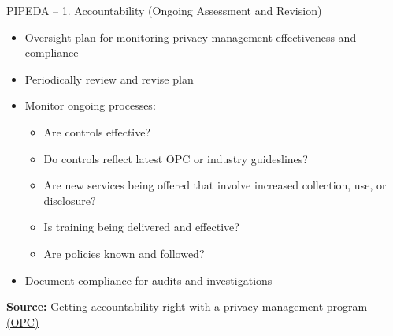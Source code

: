 \documentclass[ignorenonframetext,xcolor=x11names]{beamer}
\begin{document}
\begin{frame}[label=full]{PIPEDA -- 1. Accountability \small (Ongoing Assessment and Revision)}
\begin{itemize}
  \item Oversight plan for monitoring privacy management effectiveness and compliance
  \item Periodically review and revise plan
  \item Monitor ongoing processes:
  \begin{itemize}
     \item Are controls effective?
     \item Do controls reflect latest OPC or industry guideslines?
     \item Are new services being offered that involve increased collection, use, or disclosure?
     \item Is training being delivered and effective?
     \item Are policies known and followed?
  \end{itemize}
  \item Document compliance for audits and investigations
\end{itemize}

\vspace{\baselineskip}
\scriptsize \textbf{Source:} \href{https://www.priv.gc.ca/en/privacy-topics/privacy-laws-in-canada/the-personal-information-protection-and-electronic-documents-act-pipeda/pipeda-compliance-help/pipeda-compliance-and-training-tools/gl_acc_201204/}{Getting accountability right with a privacy management program (OPC)}
\end{frame} 
\end{document}

